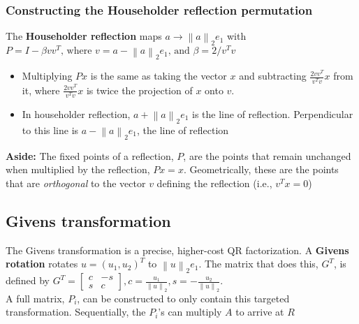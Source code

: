 \documentclass{article}
\newcommand{\norm}[2]{\left\lVert#1\right\rVert_#2}
\begin{document}
\begin{itemize}
{\subsubsection{Constructing the Householder reflection permutation}
\noindent The \textbf{Householder reflection} maps $a \rightarrow \norm{a}{2}e_1$ with $P = I - \beta vv^T \textrm{, where $v = a - \norm{a}{2}e_1$, and $\beta = 2/v^Tv$}$
\begin{itemize}
    \item Multiplying $Px$ is the same as taking the vector $x$ and subtracting $\frac{2vv^T}{v^Tv}x$ from it, where $\frac{2vv^T}{v^Tv}x$ is twice the projection of $x$ onto $v$.
    \item In householder reflection, $a + \norm{a}{2}e_1$ is the line of reflection. Perpendicular to this line is $a - \norm{a}{2}e_1$, the line of reflection
\end{itemize}

\noindent \textbf{Aside:} The fixed points of a reflection, $P$, are the points that remain unchanged when multiplied by the reflection, $Px=x$. Geometrically, these are the points that are \textit{orthogonal} to the vector $v$ defining the reflection (i.e., $v^Tx=0$)


\subsection{Givens transformation}
The Givens transformation is a precise, higher-cost QR factorization. A \textbf{Givens rotation} rotates $u = (u_1, u_2)^T$ to $\norm{u}{2}e_1$. The matrix that does this, $G^T$, is defined by $G^T = \begin{bmatrix} c & -s \\ s & c \end{bmatrix}, c = \frac{u_1}{\norm{u}{2}}, s = -\frac{u_2}{\norm{u}{2}}$. \\
A full matrix, $P_i$, can be constructed to only contain this targeted transformation. Sequentially, the $P_i$'s can multiply $A$ to arrive at $R$

}
\end{itemize}
\end{document}
